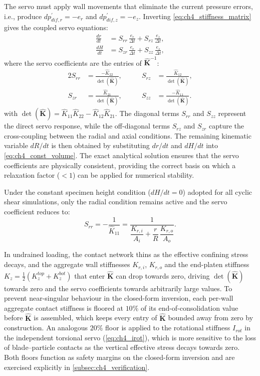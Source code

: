 \documentclass[../main]{subfiles}
\begin{document}
The servo must apply wall movements that eliminate the current pressure errors, i.e., produce $dp_{dif,r}^{\prime}=-e_r$ and $dp_{dif,z}^{\prime}=-e_z$. Inverting \cref{eq:ch4_stiffness_matrix} gives the coupled servo equations:
\begin{align}
\frac{dr}{dt} &= S_{rr}\,\frac{e_r}{\Delta t} + S_{rz}\,\frac{e_z}{\Delta t}, \label{eq:ch4_servo_dr}\\[6pt]
\frac{dH}{dt} &= S_{zr}\,\frac{e_r}{\Delta t} + S_{zz}\,\frac{e_z}{\Delta t}, \label{eq:ch4_servo_dH}
\end{align}
where the servo coefficients are the entries of $\hat{\mathbf{K}}^{-1}$:
\begin{alignat}{2}
S_{rr} &= \frac{-\hat{K}_{22}}{\det(\hat{\mathbf{K}})}, &\qquad
S_{rz} &= \frac{\hat{K}_{12}}{\det(\hat{\mathbf{K}})}, \label{eq:ch4_servo_coeff_r}\\[4pt]
S_{zr} &= \frac{\hat{K}_{21}}{\det(\hat{\mathbf{K}})}, &\qquad
S_{zz} &= \frac{-\hat{K}_{11}}{\det(\hat{\mathbf{K}})}. \label{eq:ch4_servo_coeff_z}
\end{alignat}
with $\det(\hat{\mathbf{K}}) = \hat{K}_{11}\hat{K}_{22} - \hat{K}_{12}\hat{K}_{21}$. The diagonal terms $S_{rr}$ and $S_{zz}$ represent the direct servo response, while the off-diagonal terms $S_{rz}$ and $S_{zr}$ capture the cross-coupling between the radial and axial conditions. The remaining kinematic variable $dR/dt$ is then obtained by substituting $dr/dt$ and $dH/dt$ into \cref{eq:ch4_const_volume}. The exact analytical solution ensures that the servo coefficients are physically consistent, providing the correct basis on which a relaxation factor ($<1$) can be applied for numerical stability.

Under the constant specimen height condition ($dH/dt=0$) adopted for all cyclic shear simulations, only the radial condition remains active and the servo coefficient reduces to:
\begin{equation}
S_{rr} = -\frac{1}{\hat{K}_{11}} = \frac{1}{\dfrac{K_{r,i}}{A_i}+\dfrac{r}{R}\,\dfrac{K_{r,o}}{A_o}}.
\label{eq:ch4_Srr_constantH}
\end{equation}

In undrained loading, the contact network thins as the effective confining stress decays, and the aggregate wall stiffnesses $K_{r,i}$, $K_{r,o}$ and the end-platen stiffness $K_z=\tfrac{1}{2}(K_z^{top}+K_z^{bot})$ that enter $\hat{\mathbf{K}}$ can drop towards zero, driving $\det(\hat{\mathbf{K}})$ towards zero and the servo coefficients towards arbitrarily large values. To prevent near-singular behaviour in the closed-form inversion, each per-wall aggregate contact stiffness is floored at $10\%$ of its end-of-consolidation value before $\hat{\mathbf{K}}$ is assembled, which keeps every entry of $\hat{\mathbf{K}}$ bounded away from zero by construction. An analogous $20\%$ floor is applied to the rotational stiffness $I_{rot}$ in the independent torsional servo (\cref{eq:ch4_irot}), which is more sensitive to the loss of blade--particle contacts as the vertical effective stress decays towards zero. Both floors function as safety margins on the closed-form inversion and are exercised explicitly in \cref{subsec:ch4_verification}.
\end{document}
